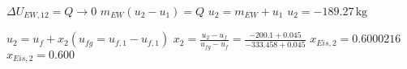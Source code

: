 \( \Delta U_{EW,12} = Q \rightarrow 0 \)  
\( m_{EW} (u_2 - u_1) = Q \)  
\( u_2 = m_{EW} + u_1 \)  
\( u_2 = -189.27 \, \text{kg} \)  

\( u_2 = u_f + x_2 (u_{fg} = u_{f,1} - u_{f,1}) \)  
\( x_2 = \frac{u_2 - u_f}{u_{fg} - u_f} = \frac{-200.1 + 0.045}{-333.458 + 0.045} \)  
\( x_{Eis,2} = 0.6000216 \)  
\( x_{Eis,2} = 0.600 \)